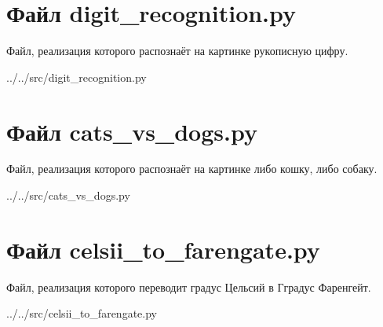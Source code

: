 
\section{Файл digit\_recognition.py}

Файл, реализация которого распознаёт на картинке рукописную цифру.


{../../src/digit_recognition.py}

\newpage


\section{Файл cats\_vs\_dogs.py}

Файл, реализация которого распознаёт на картинке либо кошку, либо собаку.


{../../src/cats_vs_dogs.py}

\newpage


\section{Файл celsii\_to\_farengate.py}

Файл, реализация которого переводит градус Цельсий в Гградус Фаренгейт.


{../../src/celsii_to_farengate.py}

